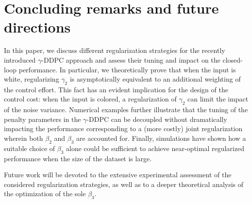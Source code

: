 \documentclass[letterpaper, 10 pt, conference]{ieeeconf}  %
\begin{document}


\section{Concluding remarks and future directions}\label{sec:conclusions}
In this paper, we discuss different regularization strategies for the recently introduced $\gamma$-DDPC approach and assess their tuning and impact on the closed-loop performance. In particular, we theoretically prove that when the input is white, regularizing $\gamma_2$ is asymptotically equivalent to an additional weighting of the control effort. This fact has an evident implication for the design of the control cost: when the input is colored, a regularization of $\gamma_2$ can limit the impact of the noise variance. Numerical examples further illustrate that the tuning of the penalty parameters in the $\gamma$-DDPC can be decoupled without dramatically impacting the performance corresponding to a (more costly) joint regularization wherein both $\beta_2$ and $\beta_3$ are accounted for. Finally, simulations have shown how a suitable choice of $\beta_3$ alone could be sufficient to achieve near-optimal regularized performance when the size of the dataset is large.

Future work will be devoted to the extensive experimental assessment of the considered regularization strategies, as well as to a deeper theoretical analysis of the optimization of the sole $\beta_3$. 

	


	

	
	
	
\end{document}
